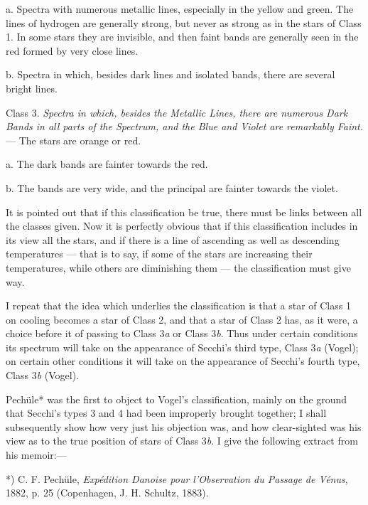 \documentclass[a4paper, 12pt, oneside, polutonikogreek, english]{article}
\begin{document}
a. Spectra with numerous metallic lines, especially in the yellow and green. The lines of hydrogen are generally strong, but never as strong as in the stars of Class 1. In some stars they are invisible, and then faint bands are generally seen in the red formed by very close lines.

b. Spectra in which, besides dark lines and isolated bands, there are several bright lines.

Class 3. \emph{Spectra in which, besides the Metallic Lines, there are numerous Dark Bands in all parts of the Spectrum, and the Blue and Violet are remarkably Faint.} --- The stars are orange or red.

a. The dark bands are fainter towards the red.

b. The bands are very wide, and the principal are fainter towards the violet.

It is pointed out that if this classification be true, there must be links between all the classes given. Now it is perfectly obvious that if this classification includes in its view all the stars, and if there is a line of ascending as well as descending temperatures --- that is to say, if some of the stars are increasing their temperatures, while others are diminishing them --- the classification must give way.

I repeat that the idea which underlies the classification is that a star of Class 1 on cooling becomes a star of Class 2, and that a star of Class 2 has, as it were, a choice before it of passing to Class 3\emph{a} or Class 3\emph{b}. Thus under certain conditions its spectrum will take on the appearance of Secchi's third type, Class 3\emph{a} (Vogel); on certain other conditions it will take on the appearance of Secchi's fourth type, Class 3\emph{b} (Vogel).

Pechüle* was the first to object to Vogel's classification, mainly on the ground that Secchi's types 3 and 4 had been improperly brought together; I shall subsequently show how very just his objection was, and how clear-sighted was his view as to the true position of stars of Class 3\emph{b}. I give the following extract from his memoir:---

*) C. F. Pechüle, \emph{Expédition Danoise pour l'Observation du Passage de Vénus}, 1882, p. 25 (Copenhagen, J. H. Schultz, 1883).
\end{document}
